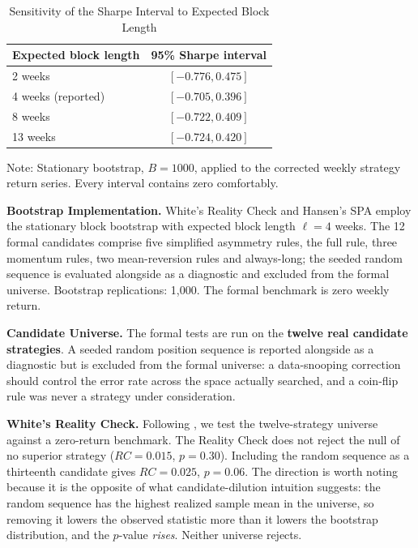 \documentclass[11pt]{article}
\begin{document}
\begin{table}[H]
\centering
\caption{Sensitivity of the Sharpe Interval to Expected Block Length}
\label{tab:blocklen}
\small
\begin{tabular}{@{}lc@{}}
\toprule
Expected block length & 95\% Sharpe interval \\
\midrule
2 weeks & $[-0.776, 0.475]$ \\
4 weeks (reported) & $[-0.705, 0.396]$ \\
8 weeks & $[-0.722, 0.409]$ \\
13 weeks & $[-0.724, 0.420]$ \\
\bottomrule
\end{tabular}
\par\vspace{0.3em}
\parbox{\linewidth}{\footnotesize Note: Stationary bootstrap, $B = 1000$, applied to the corrected weekly strategy return series. Every interval contains zero comfortably.}
\end{table}

\textbf{Bootstrap Implementation.} White's Reality Check and Hansen's SPA employ the stationary block bootstrap with expected block length $\ell = 4$ weeks. The 12 formal candidates comprise five simplified asymmetry rules, the full rule, three momentum rules, two mean-reversion rules and always-long; the seeded random sequence is evaluated alongside as a diagnostic and excluded from the formal universe. Bootstrap replications: 1,000. The formal benchmark is zero weekly return.

\textbf{Candidate Universe.} The formal tests are run on the \textbf{twelve real candidate strategies}. A seeded random position sequence is reported alongside as a diagnostic but is excluded from the formal universe: a data-snooping correction should control the error rate across the space actually searched, and a coin-flip rule was never a strategy under consideration.

\textbf{White's Reality Check.} Following \citet{white2000reality}, we test the twelve-strategy universe against a zero-return benchmark. The Reality Check does not reject the null of no superior strategy ($RC = 0.015$, $p = 0.30$). Including the random sequence as a thirteenth candidate gives $RC = 0.025$, $p = 0.06$. The direction is worth noting because it is the opposite of what candidate-dilution intuition suggests: the random sequence has the highest realized sample mean in the universe, so removing it lowers the observed statistic more than it lowers the bootstrap distribution, and the $p$-value \emph{rises}. Neither universe rejects.
\end{document}
